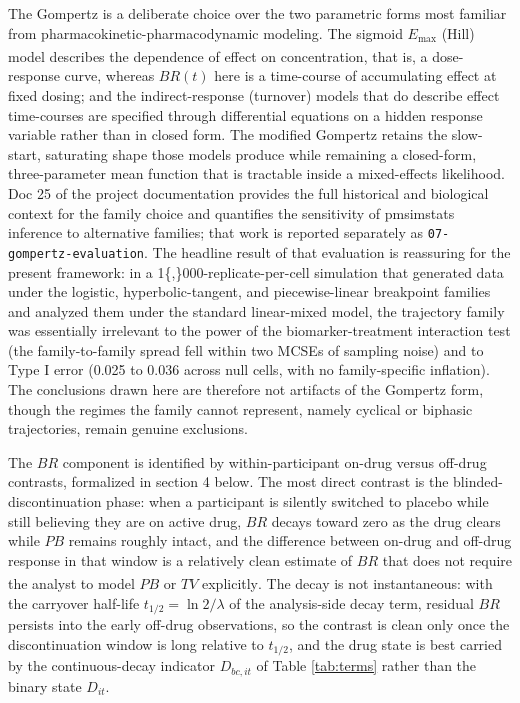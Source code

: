 \documentclass[
  11pt,
]{article}
\begin{document}
The Gompertz is a deliberate choice over the two parametric forms most
familiar from pharmacokinetic-pharmacodynamic modeling. The sigmoid \(E_{\max}\)
(Hill) model\textsuperscript{} describes the dependence of effect on
concentration, that is, a dose-response curve, whereas \(BR(t)\) here is a
time-course of accumulating effect at fixed dosing; and the indirect-response
(turnover) models that do describe effect time-courses are specified through
differential equations on a hidden response variable rather than in closed
form. The modified Gompertz retains the slow-start, saturating shape those
models produce while remaining a closed-form, three-parameter mean function
that is tractable inside a mixed-effects likelihood. Doc 25 of the project
documentation provides the full historical and biological context for the
family choice and quantifies the sensitivity of pmsimstats inference to
alternative families; that work is reported separately as
\texttt{07-gompertz-evaluation}. The headline result of that evaluation is
reassuring for the present framework: in a 1\{,\}000-replicate-per-cell
simulation that generated data under the logistic, hyperbolic-tangent, and
piecewise-linear breakpoint families and analyzed them under the standard
linear-mixed model, the trajectory family was essentially irrelevant to the
power of the biomarker-treatment interaction test (the family-to-family spread
fell within two MCSEs of sampling noise) and to Type I error (0.025 to 0.036
across null cells, with no family-specific inflation). The conclusions drawn
here are therefore not artifacts of the Gompertz form, though the regimes the
family cannot represent, namely cyclical or biphasic trajectories, remain
genuine exclusions.

The \(BR\) component is identified by within-participant on-drug versus off-drug
contrasts, formalized in section 4 below. The most direct contrast is the
blinded-discontinuation phase: when a participant is silently switched to
placebo while still believing they are on active drug, \(BR\) decays toward zero
as the drug clears while \(PB\) remains roughly intact, and the difference
between on-drug and off-drug response in that window is a relatively clean
estimate of \(BR\) that does not require the analyst to model \(PB\) or \(TV\)
explicitly\textsuperscript{}. The decay is not instantaneous: with the carryover half-life
\(t_{1/2} = \ln 2 / \lambda\) of the analysis-side decay term, residual \(BR\)
persists into the early off-drug observations, so the contrast is clean only
once the discontinuation window is long relative to \(t_{1/2}\), and the drug
state is best carried by the continuous-decay indicator \(D_{bc,it}\) of
Table \ref{tab:terms} rather than the binary state \(D_{it}\).
\end{document}
